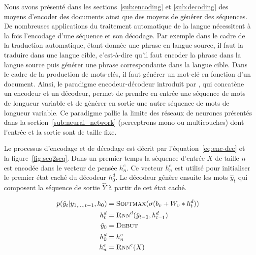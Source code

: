 Nous avons présenté dans les sections~\ref{sub:encoding} et \ref{sub:decoding} des moyens d'encoder des documents ainsi que des moyens de générer des séquences.
De nombreuses applications du traitement automatique de la langue nécessitent à la fois l'encodage d'une séquence et son décodage.
Par exemple dans le cadre de la traduction automatique, étant donnée une phrase en langue source, il faut la traduire dans une langue cible, c'est-à-dire qu'il faut encoder la phrase dans la langue source puis générer une phrase correspondante dans la langue cible.
Dans le cadre de la production de mots-clés, il faut générer un mot-clé en fonction d'un document.
Ainsi, le paradigme encodeur-décodeur introduit par \citet{sutskever_sequence_2014}, qui concatène un encodeur et un décodeur, permet de prendre en entrée une séquence de mots de longueur variable et de générer en sortie une autre séquence de mots de longueur variable.
Ce paradigme pallie la limite des réseaux de neurones présentés dans la section~\ref{sub:neural_network} (perceptrons mono ou multicouches) dont l'entrée et la sortie sont de taille fixe.

    




Le processus d'encodage et de décodage est décrit par l'équation~\ref{eq:enc-dec} et la figure~\ref{fig:seq2seq}.
Dans un premier temps la séquence d'entrée $X$ de taille $n$ est encodée dans le vecteur de pensée $h^e_n$.
Ce vecteur $h^e_n$ est utilisé pour initialiser le premier état caché du décodeur $h^d_0$.
Le décodeur génère ensuite les mots $\hat{y}_t$ qui composent la séquence de sortie $\hat{Y}$ à partir de cet état caché.

\begin{equation}\label{eq:enc-dec}
  \begin{split}
    p(\hat{y}_t | y_{1,...,t-1},h_0) & = \textsc{Softmax}(\sigma(b_v + W_v * h^d_t)) \\
    h^d_t & = \textsc{Rnn}^d(\hat{y}_{t-1}, h^d_{t-1}) \\
    \hat{y}_0 & = \textsc{Debut} \\
    h^d_0 & = h^e_n \\
    h^e_n & = \textsc{Rnn}^e(X) \\
  \end{split}
\end{equation}

